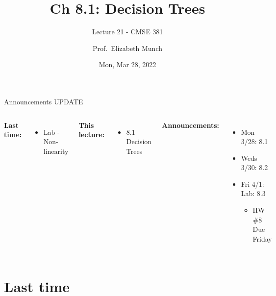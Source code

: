 \documentclass[aspectratio=169,usenames,dvipsnames]{beamer}
\begin{document}
\title[]{Ch 8.1: Decision Trees}
\subtitle{Lecture 21 - CMSE 381}
\date{Mon, Mar 28, 2022}



\author[Dr.~Munch]{Prof.~Elizabeth Munch}

\begin{frame}
 \titlepage


\end{frame}
\begin{frame}[c]{Announcements UPDATE}

\begin{columns}
\centering

	\textbf{Last time:}
	\begin{itemize}
		\item Lab - Non-linearity
	\end{itemize}

	\vspace{.2in}

	\textbf{This lecture:}
	\begin{itemize}
	\item 8.1 Decision Trees
\end{itemize}


\centering

\textbf{Announcements:}
	\begin{itemize}
	\item Mon 3/28: 8.1
	\item Weds 3/30: 8.2
	\item Fri 4/1: Lab: 8.3
	\begin{itemize}
		\item HW \#8 Due Friday
	\end{itemize}

	\end{itemize}
\end{columns}

\end{frame}



\section{Last time}
\end{document}
